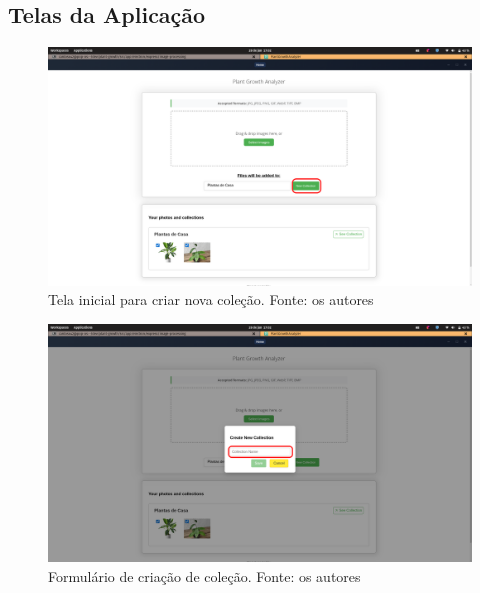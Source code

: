 \subsection{Telas da Aplicação}

\begin{figure}[H]
    \centering
    \includegraphics[width=1\textwidth]{../figures/screens/uc007/Screenshot from 2025-06-28 17-02-44.png}
    \caption{Tela inicial para criar nova coleção. Fonte: os autores}
    \label{fig:uc007-screen1}
\end{figure}

\begin{figure}[H]
    \centering
    \includegraphics[width=1\textwidth]{../figures/screens/uc007/Screenshot from 2025-06-28 17-02-47.png}
    \caption{Formulário de criação de coleção. Fonte: os autores}
    \label{fig:uc007-screen2}
\end{figure}

